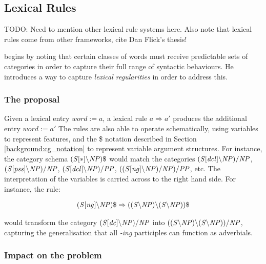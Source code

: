 \documentclass[11pt,twoside,final]{ahudson-harvard}
\newcommand{\cf}[1]{\mbox{$\it{#1}$}}   %
\newcommand{\assign}{:=\xspace}
\newcommand{\candc}{\textsc{C}\&\textsc{C}\xspace}
\begin{document}

\subsection{Lexical Rules}

TODO: Need to mention other lexical rule systems here. Also note that lexical rules come from other frameworks, cite Dan Flick's thesis!

\citet{carpenter:92} begins by noting that certain classes of words must receive predictable sets of categories in order to capture their full range of syntactic behaviours. He introduces a way to capture \emph{lexical regularities} in order to address this.

\subsubsection{The proposal}
 
Given a lexical entry $word \assign a$, a lexical rule $a \Rightarrow a'$ produces the additional entry $word \assign a'$ The rules are also able to operate schematically, using variables to represent features, and the \$ notation described in Section \ref{background:cg_notation} to represent variable argument structures. For instance, the category schema \cf{(S[*]\bs NP)\$} would match the categories \cf{(S[dcl]\bs NP)/NP}, \cf{(S[pss]\bs NP)/NP}, \cf{(S[dcl]\bs NP)/PP}, \cf{((S[ng]\bs NP)/NP)/PP}, etc. The interpretation of the variables is carried across to the right hand side. For instance, the rule:
 
\begin{eqnarray}
  \cf{(S[ng]\bs NP)\$} \Rightarrow \cf{((S\bs NP)\bs (S\bs NP))\$}
\end{eqnarray}
 
would transform the category \cf{(S[dc]\bs NP)/NP} into \cf{((S\bs NP)\bs (S\bs NP))/NP}, capturing the generalisation that all \emph{-ing} participles can function as adverbials.

\subsubsection{Impact on the problem}
\end{document}
